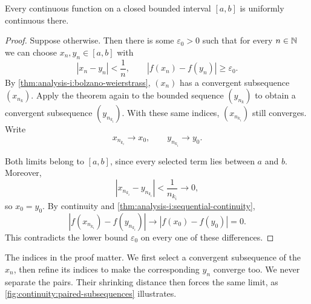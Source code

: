 \begin{theorem}
  \label{thm:analysis-i:heine-cantor}
  Every continuous function on a closed bounded interval $[a,b]$
  is uniformly continuous there.
\end{theorem}

\begin{proof}
  Suppose otherwise. Then there is some $\varepsilon_0>0$ such that
  for every $n\in\mathbb{N}$ we can choose $x_n,y_n\in[a,b]$ with
  \[
    |x_n-y_n|<\frac1n,
    \qquad |f(x_n)-f(y_n)|\ge\varepsilon_0.
  \]
  By \autoref{thm:analysis-i:bolzano-weierstrass}, $(x_n)$ has a
  convergent subsequence $(x_{n_k})$. Apply the theorem again to the
  bounded sequence $(y_{n_k})$ to obtain a convergent subsequence
  $(y_{n_{k_i}})$. With these same indices, $(x_{n_{k_i}})$ still
  converges. Write
  \[
    x_{n_{k_i}}\longrightarrow x_0,
    \qquad y_{n_{k_i}}\longrightarrow y_0.
  \]
  \begin{marginfigure}
    \centering
    
    \caption[Paired subsequences approach the same point.]{Schematic pairs selected with common indices.
      Their separation tends to zero. Once both subsequences converge,
      their limits must coincide. The selection continues beyond the
      three pairs drawn.}
    \label{fig:continuity:paired-subsequences}
  \end{marginfigure}
  Both limits belong to $[a,b]$, since every selected term lies between
  $a$ and $b$. Moreover,
  \[
    |x_{n_{k_i}}-y_{n_{k_i}}|
    <\frac1{n_{k_i}}\longrightarrow0,
  \]
  so $x_0=y_0$. By continuity and
  \autoref{thm:analysis-i:sequential-continuity},
  \[
    |f(x_{n_{k_i}})-f(y_{n_{k_i}})|
    \longrightarrow |f(x_0)-f(y_0)|=0.
  \]
  This contradicts the lower bound $\varepsilon_0$ on every one of
  these differences.
\end{proof}



The indices in the proof matter. We first select a convergent subsequence
of the $x_n$, then refine its indices to make the corresponding $y_n$
converge too. We never separate the pairs. Their shrinking distance then
forces the same limit, as \autoref{fig:continuity:paired-subsequences}
illustrates.


